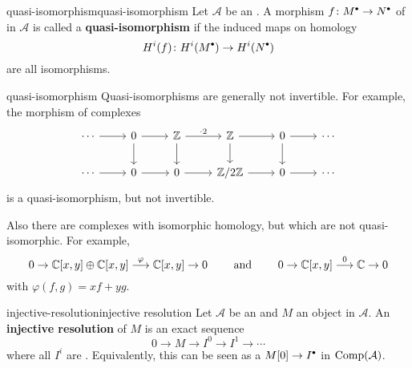 \begin{topic}{quasi-isomorphism}{quasi-isomorphism}
    Let $\mathcal{A}$ be an . A morphism $f \colon M^\bdot \to N^\bdot$ of  in $\mathcal{A}$ is called a \textbf{quasi-isomorphism} if the induced maps on homology
    \[ H^i(f) \colon H^i(M^\bdot) \to H^i(N^\bdot) \]
    are all isomorphisms.
\end{topic}

\begin{example}{quasi-isomorphism}
    Quasi-isomorphisms are generally not invertible. For example, the morphism of complexes
    \[ \svg \begin{tikzcd} \cdots \arrow{r} & 0 \arrow{d} \arrow{r} & \ZZ \arrow{r}{\cdot 2} \arrow{d} & \ZZ \arrow{r} \arrow{d} & 0 \arrow{r} \arrow{d} & \cdots \\ \cdots \arrow{r} & 0 \arrow{r} & 0 \arrow{r} & \ZZ/2\ZZ \arrow{r} & 0 \arrow{r} & \cdots  \end{tikzcd} \]
    is a quasi-isomorphism, but not invertible.
    
    Also there are complexes with isomorphic homology, but which are not quasi-isomorphic. For example,
    \[ 0 \to \mathbb{C}[x, y] \oplus \mathbb{C}[x, y] \overset{\varphi}{\longrightarrow} \mathbb{C}[x, y] \to 0 \qquad \text{ and } \qquad 0 \to \mathbb{C}[x, y] \overset{0}{\longrightarrow} \mathbb{C} \to 0 \]
    with $\varphi(f, g) = xf + yg$.
\end{example}

\begin{topic}{injective-resolution}{injective resolution}
    Let $\mathcal{A}$ be an  and $M$ an object in $\mathcal{A}$. An \textbf{injective resolution} of $M$ is an exact sequence
    \[ 0 \to M \to I^0 \to I^1 \to \cdots \]
    where all $I^i$ are . Equivalently, this can be seen as a  $M[0] \to I^\bdot$ in $\textup{Comp}(\mathcal{A})$.
\end{topic}

